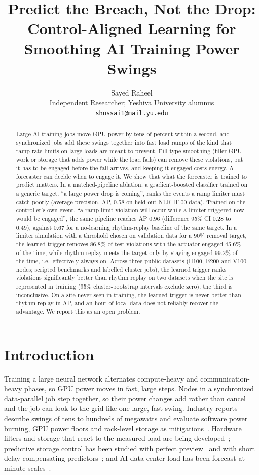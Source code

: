 \documentclass[11pt]{article}
\title{Predict the Breach, Not the Drop:\\Control-Aligned Learning for Smoothing AI Training Power Swings}
\author{Sayed Raheel\\\small Independent Researcher; Yeshiva University alumnus\\\small\texttt{shussai1@mail.yu.edu}}
\date{}
\begin{document}
\maketitle

\begin{abstract}
Large AI training jobs move GPU power by tens of percent within a second, and synchronized jobs add
these swings together into fast load ramps of the kind that ramp-rate limits on large loads are meant to
prevent. Fill-type smoothing (filler GPU
work or storage that adds power while the load falls) can remove these violations, but it has to be
engaged before the fall arrives, and keeping it engaged costs energy. A forecaster can decide when to
engage it. We show that what the forecaster is trained to predict matters.
In a matched-pipeline ablation, a gradient-boosted classifier trained on a generic
target, ``a large power drop is coming'', ranks the events a ramp limiter must catch poorly (average
precision, AP, 0.58 on held-out NLR H100 data). Trained on the controller's own event,
``a ramp-limit violation will occur while a limiter triggered now would be engaged'', the same pipeline
reaches AP 0.96 (difference 95\% CI 0.28 to
0.49), against 0.67 for a no-learning rhythm-replay baseline of the same
target. In a limiter simulation with a threshold chosen on validation
data for a 90\% removal target, the learned trigger removes 86.8\% of test violations
with the actuator engaged 45.6\% of the time, while rhythm replay meets the target
only by staying engaged 99.2\% of the time, i.e.\ effectively always on. Across
three public datasets (H100, B200 and V100 nodes; scripted benchmarks and labelled cluster jobs), the learned trigger
ranks violations significantly better than rhythm replay on two datasets when the site is represented in
training (95\% cluster-bootstrap intervals exclude zero); the third is inconclusive. On a site never seen in training, the learned trigger is never
better than rhythm replay in AP, and an hour of local data does not reliably recover the advantage. We
report this as an open problem.
\end{abstract}

\section{Introduction}

Training a large neural network alternates compute-heavy and communication-heavy phases, so GPU power
moves in fast, large steps. Nodes in a synchronized data-parallel job step together, so their power
changes add rather than cancel and the job can look to the grid like one large, fast swing. Industry reports describe swings of tens to hundreds of megawatts and
evaluate software power burning, GPU power floors and rack-level storage as mitigations~\cite{msft_stab}.
Hardware filters and storage that react to the measured load are being developed~\cite{easyrider,
activefilter}; predictive storage control has been studied with perfect preview~\cite{hess} and with
short delay-compensating predictors~\cite{delaycomp}; and AI data center load has been forecast at minute
scales~\cite{stlf}.
\end{document}
